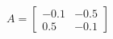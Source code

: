 \documentclass[preview]{standalone}
\begin{document}
\begin{align*}
A = \begin{bmatrix} -0.1 & -0.5 \\ 0.5 & -0.1 \end{bmatrix}
\end{align*}
\end{document}
